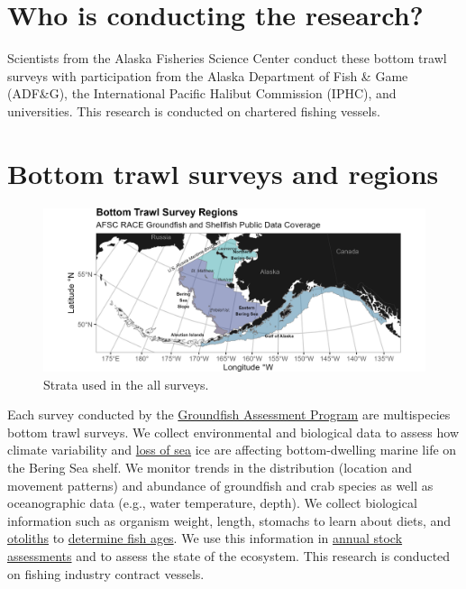 \documentclass[
  letterpaper,
  oneside,
  open=any]{scrbook}
\begin{document}
\section{Who is conducting the
research?}\label{who-is-conducting-the-research-1}

Scientists from the Alaska Fisheries Science Center conduct these bottom
trawl surveys with participation from the Alaska Department of Fish \&
Game (ADF\&G), the International Pacific Halibut Commission (IPHC), and
universities. This research is conducted on chartered fishing vessels.

\section{Bottom trawl surveys and
regions}\label{bottom-trawl-surveys-and-regions}

\begin{figure}[H]

{\centering \includegraphics[width=7in,height=\textheight]{content/../img/survey_plot_all.png}

}

\caption{Strata used in the all surveys.}

\end{figure}%

Each survey conducted by the
\href{https://www.fisheries.noaa.gov/alaska/population-assessments/north-pacific-groundfish-stock-assessments-and-fishery-evaluation}{Groundfish
Assessment Program} are multispecies bottom trawl surveys. We collect
environmental and biological data to assess how climate variability and
\href{https://www.fisheries.noaa.gov/alaska/ecosystems/habitat-and-ecological-processes-research-regarding-loss-sea-ice}{loss
of sea} ice are affecting bottom-dwelling marine life on the Bering Sea
shelf. We monitor trends in the distribution (location and movement
patterns) and abundance of groundfish and crab species as well as
oceanographic data (e.g., water temperature, depth). We collect
biological information such as organism weight, length, stomachs to
learn about diets, and
\href{https://www.fisheries.noaa.gov/alaska/science-data/alaska-age-and-growth-procedures-otolith-examination}{otoliths}
to
\href{https://www.fisheries.noaa.gov/alaska/science-data/fish-otolith-chronologies}{determine
fish ages}. We use this information in
\href{https://www.fisheries.noaa.gov/alaska/population-assessments/north-pacific-groundfish-stock-assessments-and-fishery-evaluation}{annual
stock assessments} and to assess the state of the ecosystem. This
research is conducted on fishing industry contract vessels.
\end{document}
